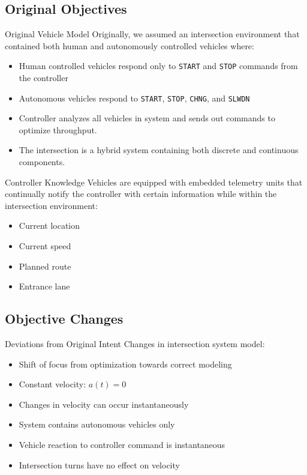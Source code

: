 \subsection{Original Objectives}

\begin{frame}{Original Vehicle Model}
Originally, we assumed an intersection environment that contained both
human and autonomously controlled vehicles where:
\begin{itemize}
\item Human controlled vehicles respond only to \texttt{START} and 
	\texttt{STOP} commands from the controller
\item Autonomous vehicles respond to \texttt{START}, \texttt{STOP},
	\texttt{CHNG}, and \texttt{SLWDN}
\item Controller analyzes all vehicles in system and sends out commands
	to optimize throughput.
\item The intersection is a hybrid system containing both discrete and
	continuous components.
\end{itemize}
\end{frame}

\begin{frame}{Controller Knowledge}
Vehicles are equipped with embedded telemetry units that continually
notify the controller with certain information while within the
intersection environment:
\begin{itemize}
\item Current location
\item Current speed
\item Planned route
\item Entrance lane
\end{itemize}
\end{frame}

\subsection{Objective Changes}

\begin{frame}{Deviations from Original Intent}
Changes in intersection system model:
\begin{itemize}
\item Shift of focus from optimization towards correct modeling
\item Constant velocity: $a(t) = 0$
\item Changes in velocity can occur instantaneously
\item System contains autonomous vehicles only
\item Vehicle reaction to controller command is instantaneous
\item Intersection turns have no effect on velocity
\end{itemize}
\end{frame}


